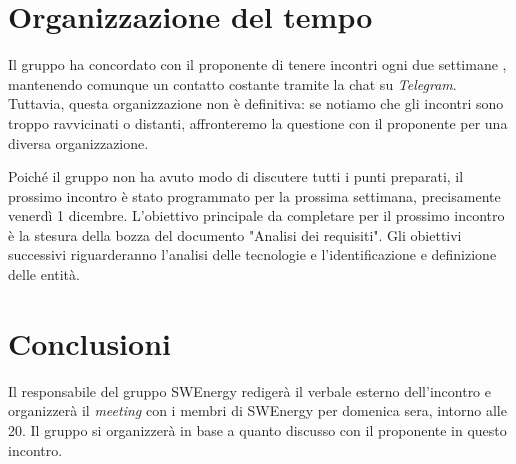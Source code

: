 \section{Organizzazione del tempo}

Il gruppo ha concordato con il proponente di tenere incontri ogni due settimane
, mantenendo comunque un contatto costante tramite la chat su \textit{Telegram}.
Tuttavia, questa organizzazione non è definitiva: se notiamo che gli incontri
sono troppo ravvicinati o distanti, affronteremo la questione con il
proponente per una diversa organizzazione.

Poiché il gruppo non ha avuto modo di discutere tutti i punti preparati, il
prossimo incontro è stato programmato per la prossima settimana, precisamente
venerdì 1 dicembre. L'obiettivo principale da completare per il prossimo
incontro è la stesura della bozza del documento "Analisi dei requisiti". Gli
obiettivi successivi riguarderanno l'analisi delle tecnologie e
l'identificazione e definizione delle entità.

\section{Conclusioni}

Il responsabile del gruppo SWEnergy redigerà il verbale esterno dell'incontro
e organizzerà il \textit{meeting} con i membri di SWEnergy per domenica sera,
intorno alle 20. Il gruppo si organizzerà in base a quanto discusso con il
proponente in questo incontro.
